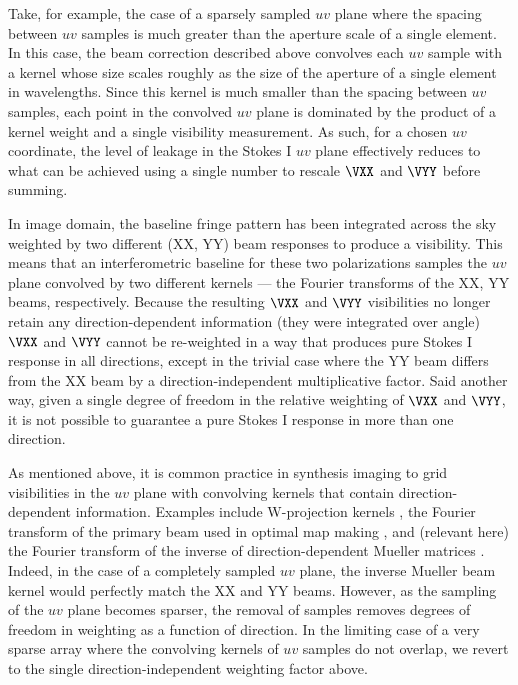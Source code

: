 \documentclass[twocolumn,apj,numberedappendix]{emulateapj}
\begin{document}
Take, for example, the case of a sparsely sampled $uv$ plane where the spacing between $uv$ samples is much greater than
the aperture scale of a single element.  In this case, the beam correction described above 
convolves each $uv$ sample with a kernel whose size scales roughly as the size of the aperture of a
single element in wavelengths.  Since this kernel is much smaller than the spacing between $uv$ samples, 
each point in the convolved $uv$ plane is dominated by the product of a kernel weight and a single visibility measurement.
As such, for a chosen $uv$ coordinate, the level of leakage in the Stokes I $uv$ plane effectively reduces to
what can be achieved using a single number to rescale $\VXX$ and $\VYY$ before 
summing.

In image domain, the baseline fringe pattern has been
integrated across the sky weighted by two different (XX, YY) beam responses to produce
a visibility.  This means
that an interferometric baseline for these two polarizations samples the $uv$
plane convolved by two different kernels --- the Fourier transforms of the XX,
YY beams, respectively.  Because the resulting $\VXX$ and $\VYY$ visibilities no
longer retain any direction-dependent information (they were integrated over
angle) $\VXX$ and $\VYY$ cannot be re-weighted in a way that produces pure Stokes I
response in all directions, except in the trivial case where the YY beam differs
from the XX beam by a direction-independent multiplicative factor.  Said
another way, given a single degree of freedom in the relative weighting of $\VXX$
and $\VYY$, it is not possible to guarantee a pure Stokes I response in more than
one direction.

As mentioned above, it is common practice in synthesis imaging 
to grid visibilities in the $uv$ plane
with convolving kernels that contain direction-dependent information.  Examples
include W-projection kernels \citep{cornwell_et_al2003}, the Fourier transform of the primary beam used in
optimal map making \citep{morales_matejek2009,bhatnagar_et_al2008}, and (relevant here) the 
Fourier transform of the inverse of
direction-dependent Mueller matrices \citep{tasse_et_al2013}.  Indeed, in the case of a completely
sampled $uv$ plane, the inverse Mueller beam kernel would perfectly match the XX
and YY beams.  However, as the sampling of the $uv$ plane becomes sparser, the
removal of samples removes degrees of freedom in weighting as a function of
direction.  In the limiting case of a very sparse array where the convolving
kernels of $uv$ samples do not overlap, we revert to the single
direction-independent weighting factor above.
\end{document}
